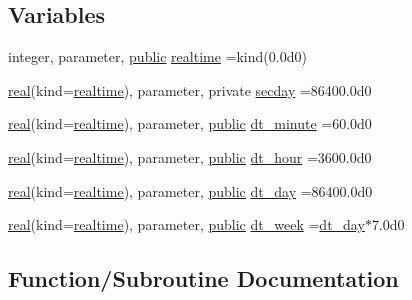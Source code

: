 \subsection*{Variables}
\begin{DoxyCompactItemize}
\item 
integer, parameter, \hyperlink{M__stopwatch_83_8txt_a2f74811300c361e53b430611a7d1769f}{public} \hyperlink{namespacem__time_ac10ea9e8d59ec74eaa7d89f2517d7422}{realtime} =kind(0.\+0d0)
\item 
\hyperlink{read__watch_83_8txt_abdb62bde002f38ef75f810d3a905a823}{real}(kind=\hyperlink{namespacem__time_ac10ea9e8d59ec74eaa7d89f2517d7422}{realtime}), parameter, private \hyperlink{namespacem__time_a48130b5a95a3f2e776269dcee1426797}{secday} =86400.\+0d0
\item 
\hyperlink{read__watch_83_8txt_abdb62bde002f38ef75f810d3a905a823}{real}(kind=\hyperlink{namespacem__time_ac10ea9e8d59ec74eaa7d89f2517d7422}{realtime}), parameter, \hyperlink{M__stopwatch_83_8txt_a2f74811300c361e53b430611a7d1769f}{public} \hyperlink{namespacem__time_a9fe6fbb44e2779a2fcf96fba36c08918}{dt\+\_\+minute} =60.\+0d0
\item 
\hyperlink{read__watch_83_8txt_abdb62bde002f38ef75f810d3a905a823}{real}(kind=\hyperlink{namespacem__time_ac10ea9e8d59ec74eaa7d89f2517d7422}{realtime}), parameter, \hyperlink{M__stopwatch_83_8txt_a2f74811300c361e53b430611a7d1769f}{public} \hyperlink{namespacem__time_aa0ca2172092f5e7dcc9b8524e6516fd8}{dt\+\_\+hour} =3600.\+0d0
\item 
\hyperlink{read__watch_83_8txt_abdb62bde002f38ef75f810d3a905a823}{real}(kind=\hyperlink{namespacem__time_ac10ea9e8d59ec74eaa7d89f2517d7422}{realtime}), parameter, \hyperlink{M__stopwatch_83_8txt_a2f74811300c361e53b430611a7d1769f}{public} \hyperlink{namespacem__time_a97725f8d657c24badff19a794f323a6b}{dt\+\_\+day} =86400.\+0d0
\item 
\hyperlink{read__watch_83_8txt_abdb62bde002f38ef75f810d3a905a823}{real}(kind=\hyperlink{namespacem__time_ac10ea9e8d59ec74eaa7d89f2517d7422}{realtime}), parameter, \hyperlink{M__stopwatch_83_8txt_a2f74811300c361e53b430611a7d1769f}{public} \hyperlink{namespacem__time_a3d53519e90264faccdae67e389ffc003}{dt\+\_\+week} =\hyperlink{namespacem__time_a97725f8d657c24badff19a794f323a6b}{dt\+\_\+day}$\ast$7.\+0d0
\end{DoxyCompactItemize}


\subsection{Function/\+Subroutine Documentation}
\mbox{\label{namespacem__time_a0fe7540912df30d3578f3c469413aea8}} 
